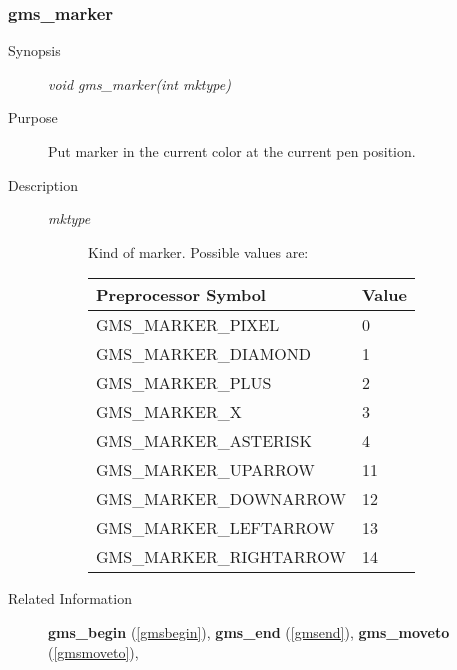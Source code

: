 \newpage



\subsubsection{gms\_marker\label{gmsmarker}}
\begin{description}
\item[Synopsis]\mbox{}


{\em void    gms\_marker(int mktype)\/}
\item[Purpose]\mbox{}


Put marker in the  current color at the current pen position.
\item[Description]\mbox{}


\begin{description}
\item[{\em mktype\/}]\mbox{}

 Kind of marker. Possible values are:
\begin{center}
\begin{tabular}{ll}\hline
Preprocessor Symbol & Value\\ 
\hline
GMS\_MARKER\_PIXEL & 0\\ 
GMS\_MARKER\_DIAMOND & 1\\ 
GMS\_MARKER\_PLUS & 2\\ 
GMS\_MARKER\_X & 3\\ 
GMS\_MARKER\_ASTERISK & 4\\ 
GMS\_MARKER\_UPARROW & 11\\ 
GMS\_MARKER\_DOWNARROW & 12\\ 
GMS\_MARKER\_LEFTARROW & 13\\ 
GMS\_MARKER\_RIGHTARROW& 14\\ 
\hline\end{tabular}
\end{center}
    
\end{description}

\item[Related Information]\mbox{}


{\bf gms\_begin} (\ref{gmsbegin}), 
{\bf gms\_end} (\ref{gmsend}), 
{\bf gms\_moveto} (\ref{gmsmoveto}), 
\end{description}



\newpage



